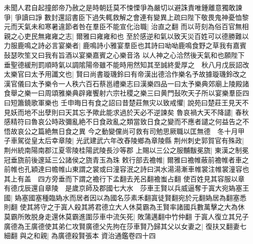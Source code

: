 未聞人君自起撞郎帝乃赦之是時朝廷莫不悚慄爭為嚴切以避誅責唯鍾離意獨敢諫爭|{
	爭讀曰諍}
數封還詔書臣下過失輒救解之會連有變異上疏曰陛下敬畏鬼神憂恤黎元而天氣未和寒暑違節者咎在羣臣不能宣化治職|{
	治直之翻}
而以苛刻為俗百官無相親之心吏民無雍雍之志|{
	爾雅曰雍雍和也}
至於感逆和氣以致天災百姓可以德勝難以力服鹿鳴之詩必言宴樂者|{
	鹿鳴詩小雅宴羣臣也其詩曰呦呦鹿鳴食野之草我有嘉賓鼔瑟吹笙又曰我有旨酒以宴樂嘉賓之心樂音洛}
以人神之心洽然後天氣和也願陛下垂聖德緩刑罰順時氣以調隂陽帝雖不能時用然知其至誠終愛厚之　秋八月戊辰詔改太樂官曰太予用讖文也|{
	賢曰尚書璇璣鈴曰有帝漢出德洽作樂名予故據璇璣鈴改之漢官儀曰太予樂令一人秩六百石蔡邕禮樂志曰漢樂四品一曰太予樂典郊廟上陵殿諸食舉之樂一曰周頌雅樂典辟雍饗射六宗社稷之樂三曰黄門鼔吹天子所以宴樂羣臣四曰短簫鐃歌軍樂也}
壬申晦日有食之詔曰昔楚莊無灾以致戒懼|{
	說苑曰楚莊王見天不見妖而地不出孽則曰天其忘予歟此能求過於天必不逆諫矣}
魯哀禍大天不降譴|{
	春秋感精符曰魯哀公時政彌亂絶不日食政亂之類當致日食之變而不應者譴之何益告之不悟故哀公之篇絶無日食之異}
今之動變儻尚可救有司勉思厥職以匡無德　冬十月甲子車駕從皇太后幸章陵|{
	光武建武六年改舂陵鄉為章陵縣}
荆州刺史郭賀官有殊政|{
	荆州統南陽南郡江夏零陵桂陽武陵長沙等郡}
上賜以三公之服黼黻冕旒|{
	東漢之制冕冠垂旒前後邃延三公諸侯之旒青玉為珠}
敕行部去襜帷|{
	爾雅曰襜帷蔽前襜帷者車之前帷也孔穎達曰幨帷山東謂之裳或曰潼容泯之詩曰淇水湯湯漸車帷裳注帷裳潼容也其上有盖　四方旁垂而下謂之襜行下孟翻去羌呂翻襜蚩占翻}
使百姓見其容服以章有德戊辰還自章陵　是歲京師及郡國七大水　莎車王賢以兵威逼奪于寘大宛媯塞王國|{
	媯塞國塞種臨媯水而居者因以為國名莎素禾翻寘徒賢翻宛於元翻媯居為翻塞悉則翻}
使其將守之于寘人殺其將君德立大人休莫霸為王賢率諸國兵數萬擊之大為休莫霸所敗脱身走還休莫霸進圍莎車中流矢死|{
	敗蒲邁翻中竹仲翻}
于寘人復立其兄子廣德為王廣德使其弟仁攻賢廣德父先拘在莎車賢乃歸其父以女妻之|{
	復扶又翻妻七細翻}
與之和親|{
	為廣德殺賢張本}
資治通鑑卷四十四
